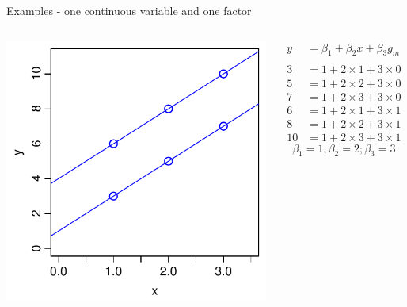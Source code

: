 \documentclass[xcolor=x11names,compress]{beamer}
\renewcommand{\(}{\begin{columns}}
\renewcommand{\)}{\end{columns}}
\newcommand{\<}[1]{\begin{column}{#1}}
\renewcommand{\>}{\end{column}}
\begin{document}
\begin{frame}{Examples - one continuous variable and one factor}

    \begin{columns}[T]
    
            \includegraphics[width=\textwidth]{TwoVars.pdf}
            
            \begin{align*}
              y  &= \beta_1  + \beta_2 x + \beta_3 g_m\\
              \\
              3   &= 1 + 2 \times 1 + 3 \times 0\\
              5   &= 1 + 2 \times 2 + 3 \times 0\\
              7   &= 1 + 2 \times 3 + 3 \times 0\\
              6   &= 1 + 2 \times 1 + 3 \times 1\\  
              8   &= 1 + 2 \times 2 + 3 \times 1\\
              10  &= 1 + 2 \times 3 + 3 \times 1
            \end{align*}
            \[\beta_1 = 1; \beta_2=2; \beta_3=3\]
    \end{columns}
\end{frame}
   
\end{document}

